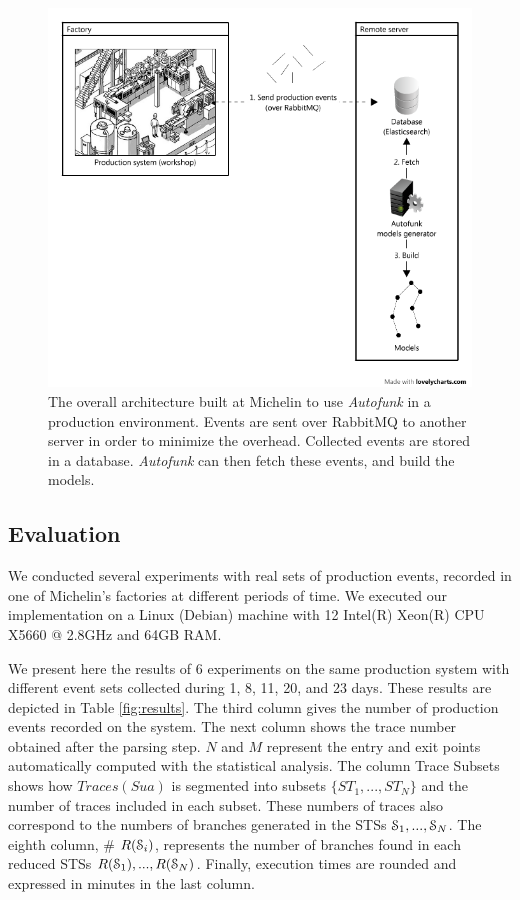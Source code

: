 \begin{figure}[ht]
    \includegraphics[width=1.0\linewidth]{figures/model-gen-branded.png}

    \caption{The overall architecture built at Michelin to use
    \textit{Autofunk} in a production environment. Events are
    sent over RabbitMQ to another server in order to minimize
    the overhead. Collected events are stored in a database.
    \textit{Autofunk} can then fetch these events, and build
    the models.}
    \label{fig:autofunk_gen_branded}
\end{figure}

\subsection{Evaluation}

We conducted several experiments with real sets of production
events, recorded in one of Michelin's factories at different
periods of time. We executed our implementation on a Linux
(Debian) machine with 12 Intel(R) Xeon(R) CPU X5660 @ 2.8GHz and
64GB RAM.

We present here the results of 6 experiments on the same
production system with different event sets collected during 1,
8, 11, 20, and 23 days. These results are depicted in Table
\ref{fig:results}. The third column gives the number of
production events recorded on the system. The next column shows
the trace number obtained after the parsing step.  $N$ and $M$
represent the entry and exit points automatically computed with
the statistical analysis. The column Trace Subsets shows how
$Traces(Sua)$ is segmented into subsets $\{ST_1,...,ST_N\}$ and
the number of traces included in each subset. These numbers of
traces also correspond to the numbers of branches generated in
the STSs $\EuScript{S}_1,...,\EuScript{S}_N$. The eighth column,
\# $R(\EuScript{S}_i)$, represents the number of branches found
in each reduced STSs $R(\EuScript{S}_1),...,R(\EuScript{S}_N)$.
Finally, execution times are rounded and expressed in minutes in
the last column.

